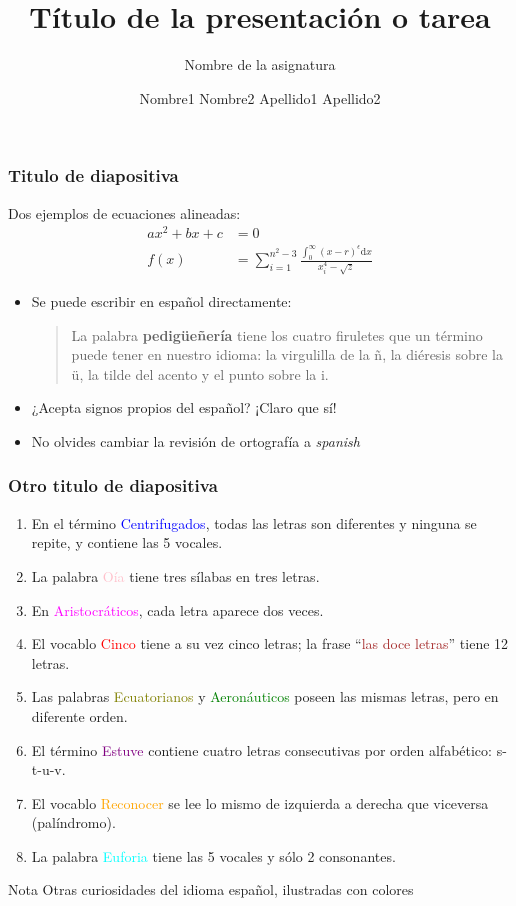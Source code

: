 \documentclass[10pt]{beamer}
\title[]
{
      \textbf{Título de la presentación o tarea}
}
\subtitle[NdA] %
{Nombre de la asignatura} %
\author[N. Apellido] %
{      Nombre1 Nombre2 Apellido1 Apellido2 %
}
\institute[]
{
      \large{Escuela Nacional de Estudios Superiores Juriquilla}\\
      Universidad Nacional Autónoma de México
  
}
\date{}
\begin{document}
{\1%
\begin{frame}[plain,noframenumbering] %
  \titlepage %
\end{frame}}
\begin{frame}
  \frametitle{Titulo de diapositiva} %
  Dos ejemplos de ecuaciones alineadas:
  \begin{align*}
      a x^2 + b x + c  &= 0 \\
      f(x) &= \sum_{i=1}^{n^2-3} \frac{\int_{0}^{\infty} \left( x-r\right)^\epsilon \mathrm{d}x}{x_i^4-\sqrt{z}}
  \end{align*}
  \begin{itemize}
      \item Se puede escribir en español directamente:
      \begin{quote}
          La palabra \textbf{pedigüeñería} tiene los cuatro firuletes que un término puede tener en nuestro idioma: la virgulilla de la ñ, la diéresis sobre la ü, la tilde del acento y el punto sobre la i.
        \end{quote}
       \item ¿Acepta signos propios del español? ¡Claro que sí!
       \item No olvides cambiar la revisión de ortografía a \emph{spanish}
  \end{itemize}
\end{frame}

\begin{frame}
  \frametitle{Otro titulo de diapositiva} %
\begin{enumerate}
    \item En el término \textcolor{blue}{Centrifugados}, todas las letras son diferentes y ninguna se repite, y contiene las 5 vocales.
    \item La palabra \textcolor{pink}{Oía} tiene tres sílabas en tres letras.
    \item En \textcolor{magenta}{Aristocráticos}, cada letra aparece dos veces.
    \item  El vocablo \textcolor{red}{Cinco} tiene a su vez cinco letras; la frase ``\textcolor{brown}{las doce letras}'' tiene 12 letras.
    \item Las palabras \textcolor{olive}{Ecuatorianos} y \textcolor{green}{Aeronáuticos} poseen las mismas letras, pero en diferente orden.
    \item El término \textcolor{purple}{Estuve} contiene cuatro letras consecutivas por orden alfabético: s-t-u-v.
    \item El vocablo \textcolor{orange}{Reconocer} se lee lo mismo de izquierda a derecha que viceversa (palíndromo).
    \item La palabra \textcolor{cyan}{Euforia} tiene las 5 vocales y sólo 2 consonantes.
\end{enumerate}
\begin{block}{Nota}
    Otras curiosidades del idioma español, ilustradas con colores
\end{block}
\end{frame}
\end{document}
